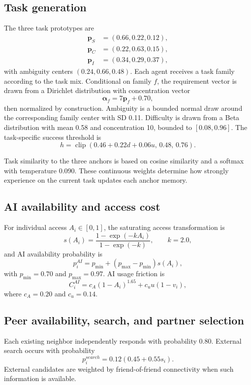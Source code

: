 \documentclass[11pt]{article}
\newcommand{\clip}{\operatorname{clip}}
\begin{document}
\subsection{Task generation}
The three task prototypes are
\begin{align}
\mathbf{p}_{S}&=(0.66,0.22,0.12),\\
\mathbf{p}_{C}&=(0.22,0.63,0.15),\\
\mathbf{p}_{I}&=(0.34,0.29,0.37),
\end{align}
with ambiguity centers $(0.24,0.66,0.48)$. Each agent receives a task family according to the task mix. Conditional on family $f$, the requirement vector is drawn from a Dirichlet distribution with concentration vector
\begin{equation}
\boldsymbol\alpha_f=7\mathbf{p}_f+0.70,
\end{equation}
then normalized by construction. Ambiguity is a bounded normal draw around the corresponding family center with SD 0.11. Difficulty is drawn from a Beta distribution with mean 0.58 and concentration 10, bounded to $[0.08,0.96]$. The task-specific success threshold is
\begin{equation}
h=\clip(0.46+0.22d+0.06u,\,0.48,\,0.76).
\end{equation}

Task similarity to the three anchors is based on cosine similarity and a softmax with temperature 0.090. These continuous weights determine how strongly experience on the current task updates each anchor memory.

\subsection{AI availability and access cost}
For individual access $A_i\in[0,1]$, the saturating access transformation is
\begin{equation}
s(A_i)=\frac{1-\exp(-kA_i)}{1-\exp(-k)},\qquad k=2.0,
\end{equation}
and AI availability probability is
\begin{equation}
p_i^{AI}=p_{\min}+(p_{\max}-p_{\min})s(A_i),
\end{equation}
with $p_{\min}=0.70$ and $p_{\max}=0.97$. AI usage friction is
\begin{equation}
C_i^{AI}=c_A(1-A_i)^{1.65}+c_u u(1-v_i),
\end{equation}
where $c_A=0.20$ and $c_u=0.14$.

\subsection{Peer availability, search, and partner selection}
Each existing neighbor independently responds with probability 0.80. External search occurs with probability
\begin{equation}
p_i^{search}=0.12(0.45+0.55s_i).
\end{equation}
External candidates are weighted by friend-of-friend connectivity when such information is available.
\end{document}
